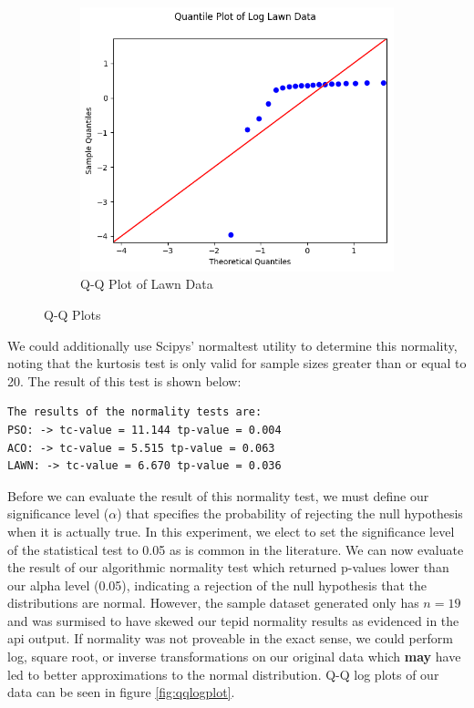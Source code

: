 \documentclass{report}
\begin{document}
\begin{figure}[H]
	~
	\begin{subfigure}{0.4\textwidth}
		\centering
		\includegraphics[width=\textwidth]{images/lawn_log_qq}
		\caption{Q-Q Plot of Lawn Data}
		\label{fig:qqlawn}
	\end{subfigure}
	\caption{Q-Q Plots}
	\label{fig:qqplot}
\end{figure}

 We could additionally use Scipys' normaltest utility to determine this normality, noting that the kurtosis test is only valid for sample sizes greater than or equal to 20. The result of this test is shown below:

\begin{Verbatim}[commandchars=\\\{\}]
The results of the normality tests are: 
PSO: -> tc-value = 11.144 tp-value = 0.004 
ACO: -> tc-value = 5.515 tp-value = 0.063 
LAWN: -> tc-value = 6.670 tp-value = 0.036

\end{Verbatim}

Before we can evaluate the result of this normality test, we must define our significance level (\(\alpha\)) that specifies the probability of rejecting the null hypothesis when it is actually true. In this experiment, we elect to set the significance level of the statistical test to 0.05 as is common in the literature. We can now evaluate the result of our algorithmic normality test which returned p-values lower than our alpha level (0.05), indicating a rejection of the null hypothesis that the distributions are normal. However, the sample dataset generated only has \(n=19\) and was surmised to have skewed our tepid normality results as evidenced in the api output. If normality was not proveable in the exact sense, we could perform log, square root, or inverse transformations on our original data which \textbf{may} have led to better approximations to the normal distribution. Q-Q log plots of our data can be seen in figure \ref{fig:qqlogplot}.
\end{document}
